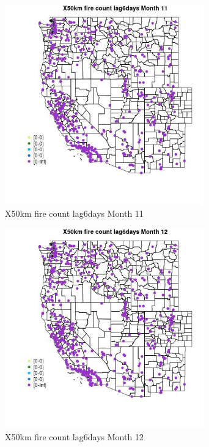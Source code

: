 \begin{figure} 
\centering  
\includegraphics[width=0.77\textwidth]{Code_Outputs/Report_ML_input_PM25_Step4_part_e_de_duplicated_aves_compiled_2019-05-14wNAs_MapObsMo11X50km_fire_count_lag6days.jpg} 
\caption{\label{fig:Report_ML_input_PM25_Step4_part_e_de_duplicated_aves_compiled_2019-05-14wNAsMapObsMo11X50km_fire_count_lag6days}X50km fire count lag6days Month 11} 
\end{figure} 
 

\begin{figure} 
\centering  
\includegraphics[width=0.77\textwidth]{Code_Outputs/Report_ML_input_PM25_Step4_part_e_de_duplicated_aves_compiled_2019-05-14wNAs_MapObsMo12X50km_fire_count_lag6days.jpg} 
\caption{\label{fig:Report_ML_input_PM25_Step4_part_e_de_duplicated_aves_compiled_2019-05-14wNAsMapObsMo12X50km_fire_count_lag6days}X50km fire count lag6days Month 12} 
\end{figure} 
 

